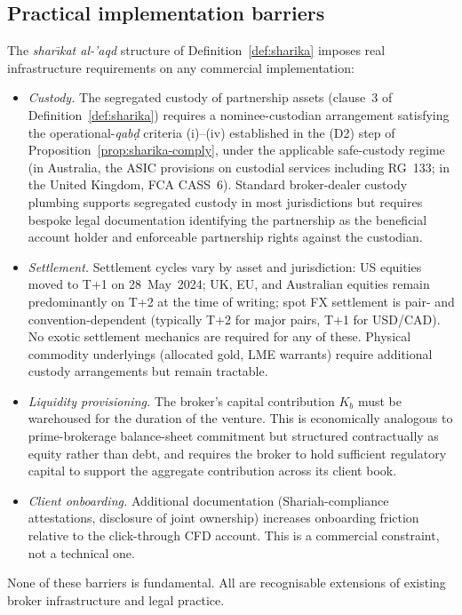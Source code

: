 \documentclass[preprint,12pt,authoryear]{elsarticle}
\theoremstyle{definition}
\begin{document}
\subsection{Practical implementation barriers}
\label{sec:disc-practical}

The \emph{shar\={\i}kat al-'aqd} structure of
Definition~\ref{def:sharika} imposes real infrastructure
requirements on any commercial implementation:
\begin{itemize}
    \item \emph{Custody.} The segregated custody of partnership
    assets (clause~3 of Definition~\ref{def:sharika}) requires
    a nominee-custodian arrangement satisfying the
    operational-\emph{qab\d{d}} criteria (i)--(iv) established
    in the (D2) step of Proposition~\ref{prop:sharika-comply},
    under the applicable safe-custody regime (in Australia, the
    ASIC provisions on custodial services including RG~133; in
    the United Kingdom, FCA CASS~6). Standard broker-dealer
    custody plumbing supports segregated custody in most
    jurisdictions but requires bespoke legal documentation
    identifying the partnership as the beneficial account
    holder and enforceable partnership rights against the
    custodian.
    \item \emph{Settlement.} Settlement cycles vary by asset
    and jurisdiction: US equities moved to T+1 on 28~May~2024;
    UK, EU, and Australian equities remain predominantly on T+2
    at the time of writing; spot FX settlement is
    pair- and convention-dependent (typically T+2 for major
    pairs, T+1 for USD/CAD). No exotic settlement mechanics are
    required for any of these. Physical commodity underlyings
    (allocated gold, LME warrants) require additional custody
    arrangements but remain tractable.
    \item \emph{Liquidity provisioning.} The broker's capital
    contribution $K_b$ must be warehoused for the duration of
    the venture. This is economically analogous to prime-brokerage
    balance-sheet commitment but structured contractually as
    equity rather than debt, and requires the broker to hold
    sufficient regulatory capital to support the aggregate
    contribution across its client book.
    \item \emph{Client onboarding.} Additional documentation
    (Shariah-compliance attestations, disclosure of joint
    ownership) increases onboarding friction relative to the
    click-through CFD account. This is a commercial constraint,
    not a technical one.
\end{itemize}
None of these barriers is fundamental. All are recognisable
extensions of existing broker infrastructure and legal practice.
\end{document}
